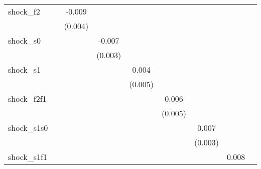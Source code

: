 {\begin{tabular}{l*{8}{c}}
\addlinespace
shock\_f2    &                     &      -0.009\sym{**} &                     &                     &                     &                     &                     &                     \\
            &                     &     (0.004)         &                     &                     &                     &                     &                     &                     \\
\addlinespace
shock\_s0    &                     &                     &      -0.007\sym{**} &                     &                     &                     &                     &                     \\
            &                     &                     &     (0.003)         &                     &                     &                     &                     &                     \\
\addlinespace
shock\_s1    &                     &                     &                     &       0.004         &                     &                     &                     &                     \\
            &                     &                     &                     &     (0.005)         &                     &                     &                     &                     \\
\addlinespace
shock\_f2f1  &                     &                     &                     &                     &       0.006         &                     &                     &                     \\
            &                     &                     &                     &                     &     (0.005)         &                     &                     &                     \\
\addlinespace
shock\_s1s0  &                     &                     &                     &                     &                     &       0.007\sym{**} &                     &                     \\
            &                     &                     &                     &                     &                     &     (0.003)         &                     &                     \\
\addlinespace
shock\_s1f1  &                     &                     &                     &                     &                     &                     &       0.008         &                     \\

\end{tabular}}
